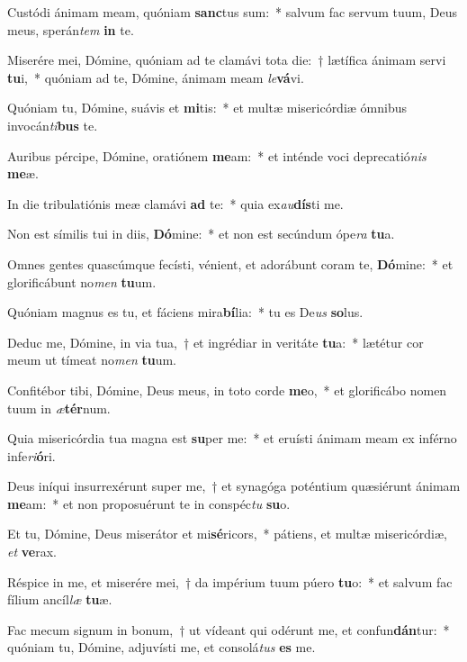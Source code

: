 \item Custódi ánimam meam, quóniam \textbf{sanc}tus sum:~* salvum fac servum tuum, Deus meus, sperán\textit{tem} \textbf{in} te.
\item Miserére mei, Dómine, quóniam ad te clamávi tota die:~† lætífica ánimam servi \textbf{tu}i,~* quóniam ad te, Dómine, ánimam meam \textit{le}\textbf{vá}vi.
\item Quóniam tu, Dómine, suávis et \textbf{mi}tis:~* et multæ misericórdiæ ómnibus invocán\textit{ti}\textbf{bus} te.
\item Auribus pércipe, Dómine, oratiónem \textbf{me}am:~* et inténde voci deprecatió\textit{nis} \textbf{me}æ.
\item In die tribulatiónis meæ clamávi \textbf{ad} te:~* quia ex\textit{au}\textbf{dís}ti me.
\item Non est símilis tui in diis, \textbf{Dó}mine:~* et non est secúndum ópe\textit{ra} \textbf{tu}a.
\item Omnes gentes quascúmque fecísti, vénient, et adorábunt coram te, \textbf{Dó}mine:~* et glorificábunt no\textit{men} \textbf{tu}um.
\item Quóniam magnus es tu, et fáciens mira\textbf{bí}lia:~* tu es De\textit{us} \textbf{so}lus.
\item Deduc me, Dómine, in via tua,~† et ingrédiar in veritáte \textbf{tu}a:~* lætétur cor meum ut tímeat no\textit{men} \textbf{tu}um.
\item Confitébor tibi, Dómine, Deus meus, in toto corde \textbf{me}o,~* et glorificábo nomen tuum in \textit{æ}\textbf{tér}num.
\item Quia misericórdia tua magna est \textbf{su}per me:~* et eruísti ánimam meam ex inférno infe\textit{ri}\textbf{ó}ri.
\item Deus iníqui insurrexérunt super me,~† et synagóga poténtium quæsiérunt ánimam \textbf{me}am:~* et non proposuérunt te in conspéc\textit{tu} \textbf{su}o.
\item Et tu, Dómine, Deus miserátor et mi\textbf{sé}ricors,~* pátiens, et multæ misericórdiæ, \textit{et} \textbf{ve}rax.
\item Réspice in me, et miserére mei,~† da impérium tuum púero \textbf{tu}o:~* et salvum fac fílium ancíl\textit{læ} \textbf{tu}æ.
\item Fac mecum signum in bonum,~† ut vídeant qui odérunt me, et confun\textbf{dán}tur:~* quóniam tu, Dómine, adjuvísti me, et consolá\textit{tus} \textbf{es} me.
